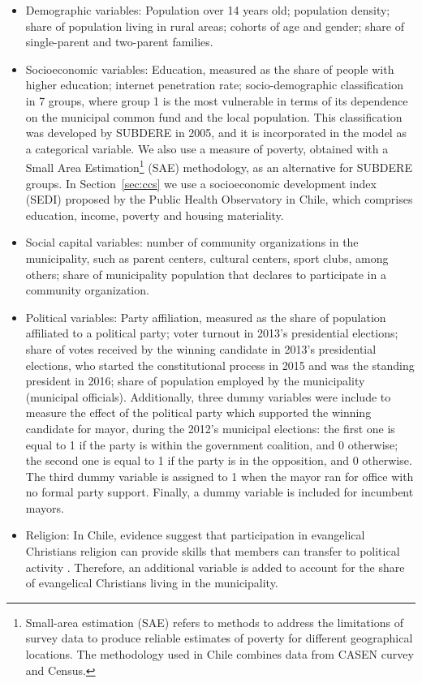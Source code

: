 \documentclass[onecolumn]{article}
\begin{document}
\begin{itemize}
\item Demographic variables: Population over 14 years old; population density; share of population living in rural areas; cohorts of age and gender; share of single-parent and two-parent families. 
\item Socioeconomic variables: Education, measured as the share of people with higher education; internet penetration rate; socio-demographic classification in 7 groups, where group 1 is the most vulnerable in terms of its dependence on the municipal common fund and the local population. This classification was developed by SUBDERE in 2005, and it is incorporated in the model as a categorical variable. We also use a measure of poverty, obtained with a Small Area Estimation\footnote{Small-area estimation (SAE) refers to methods to address the limitations of survey data to produce reliable estimates of poverty for different geographical locations. The methodology used in Chile combines data from CASEN curvey and Census.} (SAE) methodology, as an alternative for SUBDERE groups. In Section~\ref{sec:ccs} we use a socioeconomic development index (SEDI) proposed by the Public Health Observatory in Chile, which comprises education, income, poverty and housing materiality. 
\item Social capital variables: number of community organizations in the municipality, such as parent centers, cultural centers, sport clubs, among others; share of municipality population that declares to participate in a community organization.
\item Political variables: Party affiliation, measured as the share of population affiliated to a political party; voter turnout in 2013's presidential elections; share of votes received by the winning candidate in 2013's presidential elections, who started the constitutional process in 2015 and was the standing president in 2016; share of population employed by the municipality (municipal officials). Additionally, three dummy variables were include to measure the effect of the  political party which supported the winning candidate for mayor, during the 2012's  municipal elections: the first one is equal to 1 if the party is within the government coalition, and 0 otherwise; the second one is equal to 1 if the party is in the opposition, and 0 otherwise. The third dummy variable is assigned to 1 when the mayor ran for office with no formal party support. Finally, a dummy variable is included for incumbent mayors. 
\item Religion: In Chile, evidence suggest that participation in evangelical Christians religion can provide skills that members can transfer to political activity \cite{patterson2005religious}. Therefore, an additional variable is added to account for the share of evangelical Christians living in the municipality. 


\end{itemize}
\end{document}
